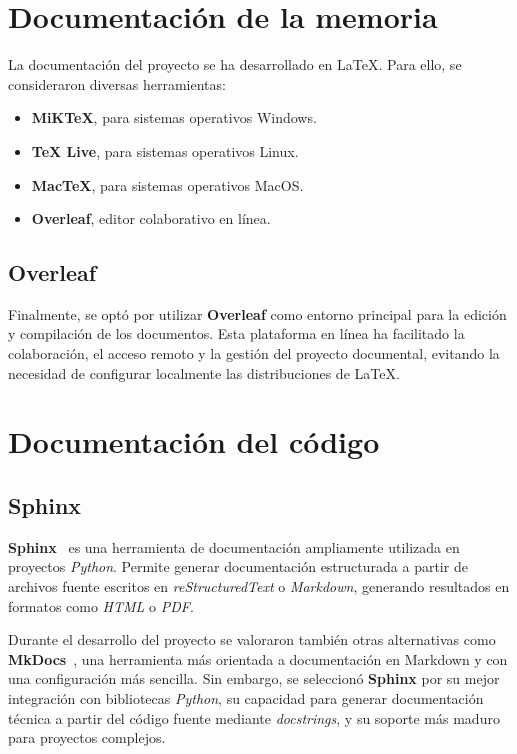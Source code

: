 \section{Documentación de la memoria}

La documentación del proyecto se ha desarrollado en \LaTeX{}. Para ello, se consideraron diversas herramientas:

\begin{itemize}
    \item \textbf{MiKTeX}, para sistemas operativos Windows.~\cite{web:miktex}
    \item \textbf{TeX Live}, para sistemas operativos Linux.~\cite{web:texlive}
    \item \textbf{MacTeX}, para sistemas operativos MacOS.~\cite{web:mactex}
    \item \textbf{Overleaf}, editor colaborativo en línea.~\cite{web:overleaf}
\end{itemize}

\subsection{Overleaf}

Finalmente, se optó por utilizar \textbf{Overleaf} como entorno principal para la edición y compilación de los 
documentos. Esta plataforma en línea ha facilitado la colaboración, el acceso remoto y la gestión 
del proyecto documental, evitando la necesidad de configurar localmente las distribuciones de \LaTeX{}.

\section{Documentación del código}

\subsection{Sphinx}

\textbf{Sphinx}~\cite{web:sphinx} es una herramienta de documentación ampliamente utilizada en proyectos \textit{Python}. Permite generar 
documentación estructurada a partir de archivos fuente escritos en \textit{reStructuredText} o \textit{Markdown}, 
generando resultados en formatos como \textit{HTML} o \textit{PDF}.

Durante el desarrollo del proyecto se valoraron también otras alternativas como \textbf{MkDocs}~\cite{web:mkdocs}, 
una herramienta más orientada a documentación en Markdown y con una configuración más sencilla. Sin embargo, 
se seleccionó \textbf{Sphinx} por su mejor integración con bibliotecas \textit{Python}, su capacidad para generar 
documentación técnica a partir del código fuente mediante \textit{docstrings}, y su soporte más maduro para 
proyectos complejos.

